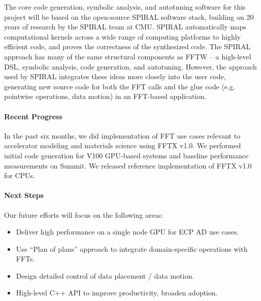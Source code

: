 The core code generation, symbolic analysis, and autotuning software for this project will be based on the open-source SPIRAL software stack,
building on 20 years of research by the SPIRAL team at CMU.
SPIRAL automatically maps computational kernels across a wide range of computing platforms to highly efficient code, and proves the correctness of the synthesized code.
The SPIRAL approach has many of the same structural components as FFTW -- a high-level DSL, symbolic analysis, code generation, and autotuning. However, the approach used by SPIRAL integrates these ideas more closely into the user code, generating new source code for both the FFT calls and the glue code (e.g. pointwise operations, data motion) in an FFT-based application.


\paragraph{Recent Progress}
In the past six months, we did implementation of FFT use cases relevant to
 accelerator modeling and materials science using FFTX v1.0. We performed 
 initial code generation for V100 GPU-based systems and baseline performance
 measurements on Summit. We released reference implementation of FFTX v1.0
 for CPUs.

\paragraph{Next Steps} Our future efforts will focus on the following areas:
\begin{itemize}
\item Deliver high performance on a single node GPU for ECP AD use cases.
\item Use ``Plan of plans'' approach to integrate domain-specific operations
  with FFTs. 
\item Design detailed control of data placement / data motion.
\item High-level C++ API to improve productivity, broaden adoption.
\end{itemize}


